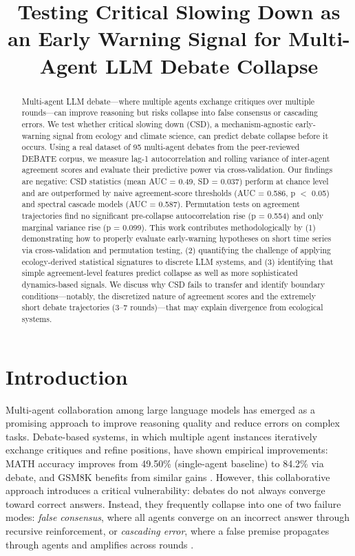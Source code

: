 \documentclass[11pt,letterpaper]{article}
\title{Testing Critical Slowing Down as an Early Warning Signal for Multi-Agent LLM Debate Collapse}
\author{}
\date{}
\begin{document}
\maketitle

\begin{abstract}
Multi-agent LLM debate---where multiple agents exchange critiques over multiple rounds---can improve reasoning but risks collapse into false consensus or cascading errors. We test whether critical slowing down (CSD), a mechanism-agnostic early-warning signal from ecology and climate science, can predict debate collapse before it occurs. Using a real dataset of 95 multi-agent debates from the peer-reviewed DEBATE corpus, we measure lag-1 autocorrelation and rolling variance of inter-agent agreement scores and evaluate their predictive power via cross-validation. Our findings are negative: CSD statistics (mean AUC = 0.49, SD = 0.037) perform at chance level and are outperformed by naive agreement-score thresholds (AUC = 0.586, p $<$ 0.05) and spectral cascade models (AUC = 0.587). Permutation tests on agreement trajectories find no significant pre-collapse autocorrelation rise (p = 0.554) and only marginal variance rise (p = 0.099). This work contributes methodologically by (1) demonstrating how to properly evaluate early-warning hypotheses on short time series via cross-validation and permutation testing, (2) quantifying the challenge of applying ecology-derived statistical signatures to discrete LLM systems, and (3) identifying that simple agreement-level features predict collapse as well as more sophisticated dynamics-based signals. We discuss why CSD fails to transfer and identify boundary conditions---notably, the discretized nature of agreement scores and the extremely short debate trajectories (3--7 rounds)---that may explain divergence from ecological systems.
\end{abstract}

\section{Introduction}

Multi-agent collaboration among large language models has emerged as a promising approach to improve reasoning quality and reduce errors on complex tasks. Debate-based systems, in which multiple agent instances iteratively exchange critiques and refine positions, have shown empirical improvements: MATH accuracy improves from 49.50\% (single-agent baseline) to 84.2\% via debate, and GSM8K benefits from similar gains \citep{Li2026}. However, this collaborative approach introduces a critical vulnerability: debates do not always converge toward correct answers. Instead, they frequently collapse into one of two failure modes: \emph{false consensus}, where all agents converge on an incorrect answer through recursive reinforcement, or \emph{cascading error}, where a false premise propagates through agents and amplifies across rounds \citep{Xie2026}.
\end{document}
